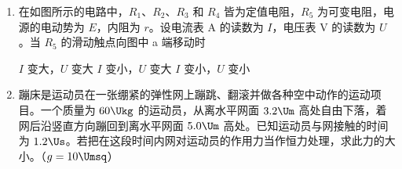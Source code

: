 \documentclass[\gkver]{gaokaozhenti}
\begin{document}
\begin{enumerate}
{

由几何关系得 $\sin\alpha=\frac{r}{\sqrt{r^{2}+l^{2}}}$，由光的折射规律得 $n=\frac{\sin\theta}{\sin\alpha}$，所以视场角 $\theta=\arcsin\frac{nr}{\sqrt{r^{2}+l^{2}}}$，故 B 正确。
}

\item
在如图所示的电路中，$R_{1}$、$R_{2}$、$R_{3}$ 和 $R_{4}$ 皆为定值电阻，$R_{5}$ 为可变电阻，电源的电动势为 $E$，内阻为 $r$。设电流表 A 的读数为 $I$，电压表 V 的读数为 $U$。当 $R_{5}$ 的滑动触点向图中 a 端移动时


{$I$ 变大，$U$ 变大}
{$I$ 变小，$U$ 变大}
{$I$ 变小，$U$ 变小}


\item
蹦床是运动员在一张绷紧的弹性网上蹦跳、翻滚并做各种空中动作的运动项目。一个质量为 $60\Ukg$ 的运动员，从离水平网面 $3.2\Um$ 高处自由下落，着网后沿竖直方向蹦回到离水平网面 $5.0\Um$ 高处。已知运动员与网接触的时间为 $1.2\Us$。若把在这段时间内网对运动员的作用力当作恒力处理，求此力的大小。（$g=10\Umsq$）

\end{enumerate}
\end{document}
